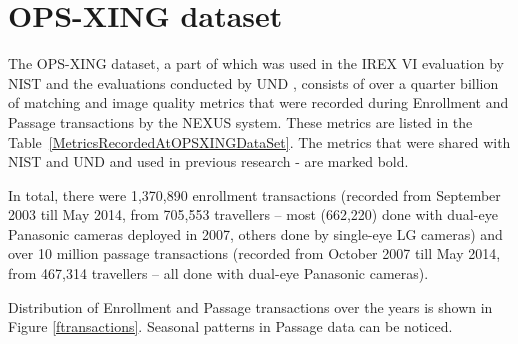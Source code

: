 \documentclass{cta-author}%
\newcommand{\cmt}[1]{}
\begin{document}
\section{OPS-XING dataset}
\label{sOPSXING}

The OPS-XING dataset,  a part of which was used in the IREX VI evaluation by NIST \cite{irexVI,Grother2015-iet} and the evaluations conducted by UND \cite{Bowyer2015-iet,Bowyer2015-cvpr,Bowyer-BTAS2016},
consists of over a quarter billion  of 
matching and image quality metrics that were recorded during Enrollment and Passage transactions
by the NEXUS system. 
These metrics are listed in the Table~\ref{MetricsRecordedAtOPSXINGDataSet}.
The  metrics that were shared with NIST and UND and used in previous research \cite{irexVI}-\cite{Bowyer-BTAS2016} are marked bold.


In total, there were 1,370,890 enrollment transactions (recorded from September 2003 till May 2014,
from 
705,553
travellers --  
most  (662,220)  done with dual-eye Panasonic cameras deployed in 2007, others done by single-eye LG  cameras) 
and over 10 million passage transactions (recorded from October 2007 till May 2014, from 467,314 travellers  -- 
all done with dual-eye Panasonic cameras).
\cmt{
Enrollment images prior to June 2007 are all captured using single-eye LG (`L') cameras. After June 2007, most of them are captured using new Panasonic cameras, some however were still captured by old LG cameras.
All passage images in the dataset are captured using new Panasonic cameras.  
}
Distribution of Enrollment and Passage transactions over the years is shown in Figure \ref{ftransactions}. Seasonal patterns in Passage data can be noticed.
\cmt{
In total,
1,370,890 enrollment transactions from 2003 till 2014
from 
705,553
travellers were recorded, of which 43,338 were enrolled with 'L' camera... ,  
and over 10 million passage transactions were recorded 
466,070 travellers
from October 2007 till May 2014 from 467,314 travellers (see Figure \ref{ftransactions}).

}
\end{document}
